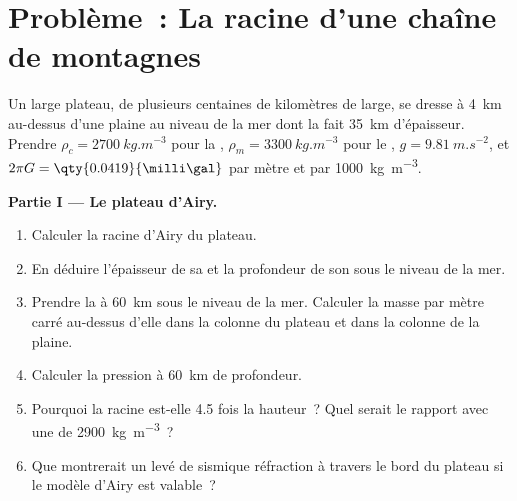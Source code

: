 \section{Problème~: La racine d'une chaîne de montagnes}

\begin{problem}
\label{pb:b1:isostasy-gravity:1}
Un large plateau, de plusieurs centaines de kilomètres de large, se dresse à \qty{4}{km} au-dessus d'une
plaine au niveau de la mer dont la  fait \qty{35}{km} d'épaisseur. Prendre
$\rho_c = \qty{2700}{kg.m^{-3}}$ pour la , $\rho_m = \qty{3300}{kg.m^{-3}}$
pour le , $g = \qty{9.81}{m.s^{-2}}$, et
$2\pi G = \qty{0.0419}{\milli\gal}$ par mètre et par \qty{1000}{kg.m^{-3}}.

\medskip
\noindent\textbf{Partie I --- Le plateau d'Airy.}
\begin{enumerate}
  \item Calculer la racine d'Airy du plateau.
  \item En déduire l'épaisseur de sa  et la profondeur de son  sous le niveau de
        la mer.
  \item Prendre la  à \qty{60}{km} sous le niveau de la mer. Calculer la
        masse par mètre carré au-dessus d'elle dans la colonne du plateau et dans la colonne
        de la plaine.
  \item Calculer la pression à \qty{60}{km} de profondeur.
  \item Pourquoi la racine est-elle 4.5 fois la hauteur~? Quel serait le rapport avec une
         de \qty{2900}{kg.m^{-3}}~?
  \item Que montrerait un levé de sismique réfraction à travers le bord du plateau
        si le modèle d'Airy est valable~?
\end{enumerate}


\end{problem}
